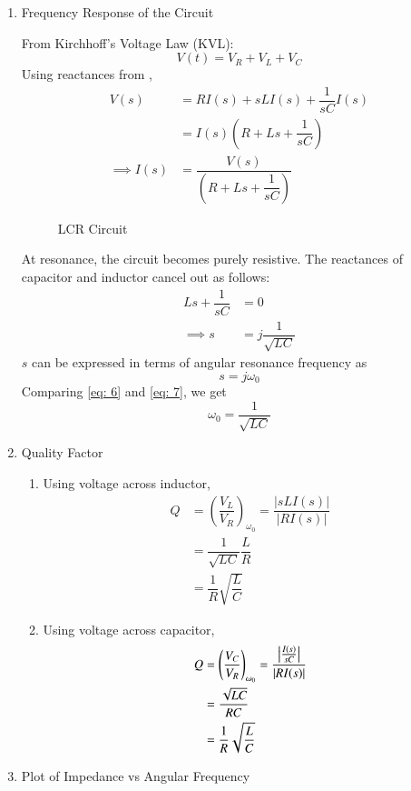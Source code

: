 \documentclass[journal,12pt,twocolumn]{IEEEtran}
\theoremstyle{remark}
\begin{document}
\begin{enumerate}
\item {Frequency Response of the Circuit}

From Kirchhoff's Voltage Law (KVL):
\begin{equation}
V(t) = V_R + V_L + V_C \label{eq:KVL}
\end{equation}
Using reactances from ,
\begin{align}
    V(s) &= R I(s) + sL I(s) + \dfrac{1}{sC} I(s)\\
    &= I(s)\left(R + Ls + \dfrac{1}{sC}\right)\\
    \implies I(s) &= \dfrac{V(s)}{\left(R + Ls + \dfrac{1}{sC}\right)} \label{eq: 4}
\end{align}
\begin{figure}[!h]
 \centering
    
    \caption{LCR Circuit}
    \label{fig:2}
\end{figure}
At resonance, the circuit becomes purely resistive. The reactances of capacitor and inductor cancel out as follows:
\begin{align}
    Ls + \dfrac{1}{sC} &= 0\\
    \implies s &= j\dfrac{1}{\sqrt{LC}} \label{eq: 6}
\end{align}
$s$ can be expressed in terms of angular resonance frequency as
\begin{equation}
    s = j\omega_0 \label{eq: 7}
\end{equation}
Comparing \eqref{eq: 6} and \eqref{eq: 7}, we get
\begin{equation}
    \omega_0 = \dfrac{1}{\sqrt{LC}}
\end{equation}
\item{Quality Factor}

\begin{enumerate}
\item Using voltage across inductor,
\begin{align}
    Q &= \left(\dfrac{V_L}{V_R}\right)_{\omega_0} = \dfrac{\lvert{sLI(s)}\rvert}{\lvert RI(s) \rvert}\\
    &= \dfrac{1}{\sqrt{LC}}\dfrac{L}{R}\\
    &= \dfrac{1}{R}\sqrt{\dfrac{L}{C}}
\end{align}
\item Using voltage across capacitor,
\begin{align}
	Q &= \left(\dfrac{V_C}{V_R}\right)_{\omega_0} = \dfrac{\left\vert\frac{I(s)}{sC}\right\vert}{\lvert RI(s) \rvert}\\
    &= \dfrac{\sqrt{LC}}{RC}\\
    &= \dfrac{1}{R}\sqrt{\dfrac{L}{C}}
\end{align}
\end{enumerate}
\item{Plot of Impedance vs Angular Frequency}


\end{enumerate}
\end{document}
